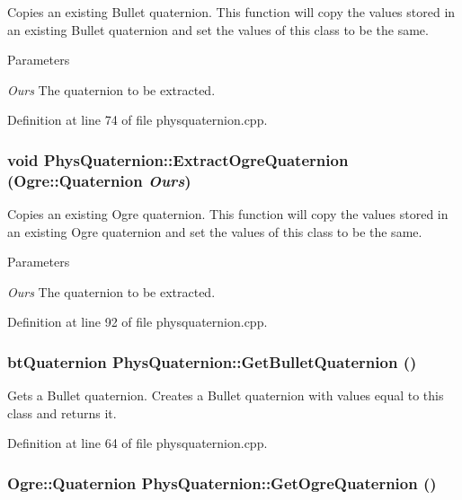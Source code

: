 Copies an existing Bullet quaternion. This function will copy the values stored in an existing Bullet quaternion and set the values of this class to be the same. 
\begin{DoxyParams}{Parameters}
\item[{\em Ours}]The quaternion to be extracted. \end{DoxyParams}


Definition at line 74 of file physquaternion.cpp.\hypertarget{classPhysQuaternion_a63dd5036c86a5353094ad7b089ede3ab}{
\subsubsection[{ExtractOgreQuaternion}]{\setlength{\rightskip}{0pt plus 5cm}void PhysQuaternion::ExtractOgreQuaternion (Ogre::Quaternion {\em Ours})}}
\label{d5/d19/classPhysQuaternion_a63dd5036c86a5353094ad7b089ede3ab}


Copies an existing Ogre quaternion. This function will copy the values stored in an existing Ogre quaternion and set the values of this class to be the same. 
\begin{DoxyParams}{Parameters}
\item[{\em Ours}]The quaternion to be extracted. \end{DoxyParams}


Definition at line 92 of file physquaternion.cpp.\hypertarget{classPhysQuaternion_a63ed0cf13cd77d8e89af9748db2e4893}{
\subsubsection[{GetBulletQuaternion}]{\setlength{\rightskip}{0pt plus 5cm}btQuaternion PhysQuaternion::GetBulletQuaternion ()}}
\label{d5/d19/classPhysQuaternion_a63ed0cf13cd77d8e89af9748db2e4893}


Gets a Bullet quaternion. Creates a Bullet quaternion with values equal to this class and returns it. 

Definition at line 64 of file physquaternion.cpp.\hypertarget{classPhysQuaternion_a30adc9ec3604da6ac9df49dc25b6fd31}{
\subsubsection[{GetOgreQuaternion}]{\setlength{\rightskip}{0pt plus 5cm}Ogre::Quaternion PhysQuaternion::GetOgreQuaternion ()}}
\label{d5/d19/classPhysQuaternion_a30adc9ec3604da6ac9df49dc25b6fd31}


